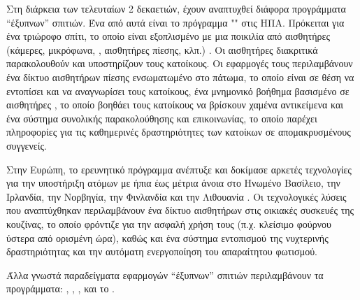 \par
Στη διάρκεια των τελευταίων 2 δεκαετιών, έχουν αναπτυχθεί διάφορα προγράμματα ``έξυπνων'' σπιτιών.
Ένα από αυτά είναι το πρόγραμμα "" στις ΗΠΑ. Πρόκειται για ένα τριώροφο σπίτι, το οποίο είναι εξοπλισμένο με μια ποικιλία από αισθητήρες (κάμερες, μικρόφωνα, , αισθητήρες πίεσης,  κλπ.) \cite{aware_home}.
Οι αισθητήρες διακριτικά παρακολουθούν και υποστηρίζουν τους κατοίκους.
Οι εφαρμογές τους περιλαμβάνουν ένα δίκτυο αισθητήρων πίεσης ενσωματωμένο στο πάτωμα, το οποίο είναι σε θέση να εντοπίσει και να αναγνωρίσει τους κατοίκους, ένα μνημονικό βοήθημα βασισμένο σε αισθητήρες , το οποίο βοηθάει τους κατοίκους να βρίσκουν χαμένα αντικείμενα και ένα σύστημα συνολικής παρακολούθησης και επικοινωνίας, το οποίο παρέχει πληροφορίες για τις καθημερινές δραστηριότητες των κατοίκων σε απομακρυσμένους συγγενείς.
\par
Στην Ευρώπη, το ερευνητικό πρόγραμμα  ανέπτυξε και δοκίμασε αρκετές τεχνολογίες για την υποστήριξη ατόμων με ήπια έως μέτρια άνοια στο Ηνωμένο Βασίλειο, την Ιρλανδία, την Νορβηγία, την Φινλανδία και την Λιθουανία \cite{Adlam2004}\cite{Cahill2007}.
Οι τεχνολογικές λύσεις που αναπτύχθηκαν περιλαμβάνουν ένα δίκτυο αισθητήρων στις οικιακές συσκευές της κουζίνας, το οποίο φρόντιζε για την ασφαλή χρήση τους (π.χ. κλείσιμο φούρνου ύστερα από ορισμένη ώρα), καθώς και ένα σύστημα εντοπισμού της νυχτερινής δραστηριότητας και την αυτόματη ενεργοποίηση του απαραίτητου φωτισμού. 
\par
Άλλα γνωστά παραδείγματα εφαρμογών ``έξυπνων'' σπιτιών περιλαμβάνουν τα προγράμματα:  \cite{Cook2013},  \cite{Das2004},  \cite{yamazaki2007},  \cite{Orpwood2004} και το  \cite{Klack2011}.

